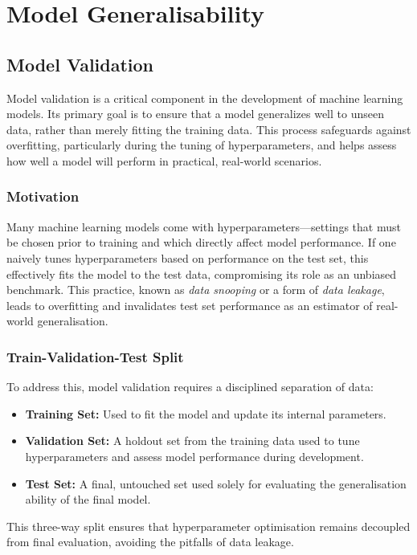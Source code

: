 \documentclass[9pt]{extarticle}
\begin{document}
\section{Model Generalisability}
\subsection{Model Validation}

Model validation is a critical component in the development of machine learning models. Its primary goal is to ensure that a model generalizes well to unseen data, rather than merely fitting the training data. This process safeguards against overfitting, particularly during the tuning of hyperparameters, and helps assess how well a model will perform in practical, real-world scenarios.

\subsubsection*{Motivation}

Many machine learning models come with hyperparameters—settings that must be chosen prior to training and which directly affect model performance. If one naively tunes hyperparameters based on performance on the test set, this effectively fits the model to the test data, compromising its role as an unbiased benchmark. This practice, known as \textit{data snooping} or a form of \textit{data leakage}, leads to overfitting and invalidates test set performance as an estimator of real-world generalisation.

\subsubsection*{Train-Validation-Test Split}

To address this, model validation requires a disciplined separation of data:
\begin{itemize}
    \item \textbf{Training Set:} Used to fit the model and update its internal parameters.
    \item \textbf{Validation Set:} A holdout set from the training data used to tune hyperparameters and assess model performance during development.
    \item \textbf{Test Set:} A final, untouched set used solely for evaluating the generalisation ability of the final model.
\end{itemize}

This three-way split ensures that hyperparameter optimisation remains decoupled from final evaluation, avoiding the pitfalls of data leakage.
\end{document}
